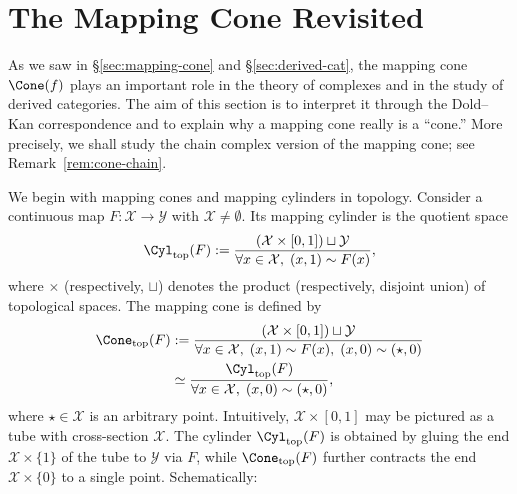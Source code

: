 
\section{The Mapping Cone Revisited}\label{sec:mapping-cone-revisited}
\hypertarget{o014.aljabr2.chapter8.mapping-cone-revisited}{ }
As we saw in \S\ref{sec:mapping-cone} and \S\ref{sec:derived-cat}, the
mapping cone $\Cone(f)$ plays an important role in the theory of complexes
and in the study of derived categories. The aim of this section is to
interpret it through the Dold--Kan correspondence and to explain why a
mapping cone really is a ``cone.'' More precisely, we shall study the chain
complex version of the mapping cone; see Remark~\ref{rem:cone-chain}.

We begin with mapping cones and mapping cylinders in topology. Consider a
continuous map $F:\mathcal{X}\to\mathcal{Y}$ with
$\mathcal{X}\neq\emptyset$. Its mapping cylinder is the quotient space
\begin{equation*}
	\Cyl_{\mathrm{top}}(F) := \dfrac{(\mathcal{X} \times [0, 1]) \sqcup \mathcal{Y}}{\forall x \in \mathcal{X}, \; (x, 1) \sim F(x)},
\end{equation*}
where $\times$ (respectively, $\sqcup$) denotes the product (respectively,
disjoint union) of topological spaces. The mapping cone is defined by
\begin{equation*}\begin{aligned}
	\Cone_{\mathrm{top}}(F) & := \dfrac{(\mathcal{X} \times [0, 1]) \sqcup \mathcal{Y}}{\forall x \in \mathcal{X}, \; (x, 1) \sim F(x), \; (x, 0) \sim (\star, 0)} \\
	& \simeq \dfrac{\Cyl_{\mathrm{top}}(F)}{\forall x \in \mathcal{X}, \; (x, 0) \sim (\star, 0)},
\end{aligned}\end{equation*}
where $\star\in\mathcal{X}$ is an arbitrary point. Intuitively,
$\mathcal{X}\times[0,1]$ may be pictured as a tube with cross-section
$\mathcal{X}$. The cylinder $\Cyl_{\mathrm{top}}(F)$ is obtained by gluing
the end $\mathcal{X}\times\{1\}$ of the tube to $\mathcal{Y}$ via $F$,
while $\Cone_{\mathrm{top}}(F)$ further contracts the end
$\mathcal{X}\times\{0\}$ to a single point. Schematically:

